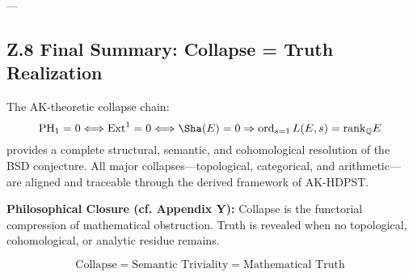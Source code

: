 ---

\subsection*{Z.8 Final Summary: Collapse = Truth Realization}

The AK-theoretic collapse chain:
\[
\mathrm{PH}_1 = 0 \Longleftrightarrow \mathrm{Ext}^1 = 0 \Longleftrightarrow \Sha(E) = 0 \Rightarrow \operatorname{ord}_{s=1} L(E,s) = \mathrm{rank}_\mathbb{Q} E
\]
provides a complete structural, semantic, and cohomological resolution of the BSD conjecture.  
All major collapses—topological, categorical, and arithmetic—are aligned and traceable through the derived framework of AK-HDPST.

\textbf{Philosophical Closure (cf. Appendix Y):}  
Collapse is the functorial compression of mathematical obstruction.  
Truth is revealed when no topological, cohomological, or analytic residue remains.

\[
\text{Collapse} = \text{Semantic Triviality} = \text{Mathematical Truth}
\]





